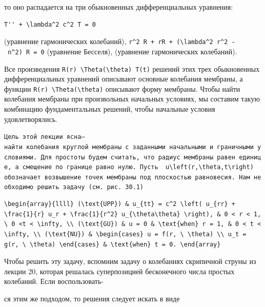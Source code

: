 \documentclass[
  ukrainian,
]{article}
\begin{document}
то оно распадается на три обыкновенных дифференциальных уравнения:

\begin{verbatim}
T'' + \lambda^2 c^2 T = 0
\end{verbatim}

(уравнение гармонических колебаний),
\texttt{r\^{}2\ R\textquotesingle{}\textquotesingle{}\ +\ rR\textquotesingle{}\ +\ (\textbackslash{}lambda\^{}2\ r\^{}2\ -\ n\^{}2)\ R\ =\ 0}
(уравнение Бесселя), (уравнение гармонических колебаний).

Все произведения
\texttt{R(r)\ \textbackslash{}Theta(\textbackslash{}theta)\ T(t)}
решений этих трех обыкновенных дифференциальных уравнений описывают
основные колебания мембраны, а функции
\texttt{R(r)\ \textbackslash{}Theta(\textbackslash{}theta)} описывают
форму мембраны. Чтобы найти колебания мембраны при произвольных
начальных условиях, мы составим такую комбинацию фундаментальных
решений, чтобы начальные условия удовлетворялись.

\texttt{Цель\ этой\ лекции\ ясна—найти\ колебания\ круглой\ мембраны\ с\ заданными\ начальными\ и\ граничными\ условиями.\ Для\ простоты\ будем\ считать,\ что\ радиус\ мембраны\ равен\ единице,\ а\ смещение\ по\ границе\ равно\ нулю.\ Пусть\ \ \textquotesingle{}u\textbackslash{}left(r,\textbackslash{}theta,t\textbackslash{}right)\textquotesingle{}\ \ обозначает\ возвышение\ точек\ мембраны\ под\ плоскостью\ равновесия.\ Нам\ необходимо\ решить\ задачу\ (см.\ рис.\ 30.1)}

\begin{verbatim}
\begin{array}{llll} (\text{UPP}) & u_{tt} = c^2 \left( u_{rr} + \frac{1}{r} u_r + \frac{1}{r^2} u_{\theta\theta} \right), & 0 < r < 1, \ 0 <t < \infty, \\ (\text{GU}) & u = 0 & \text{when} r = 1, & 0 < t < \infty, \\ (\text{NU}) & \begin{cases} u = f(r, \ \theta) \\ u_t = g(r, \ \theta) \end{cases} & \text{when} t = 0. \end{array}
\end{verbatim}

Чтобы решить эту задачу, вспомним задачу о колебаниях скрипичной струны
из лекции 20, которая решалась суперпозицией бесконечного числа простых
колебаний. Если воспользовать-

ся этим же подходом, то решения следует искать в виде
\end{document}
